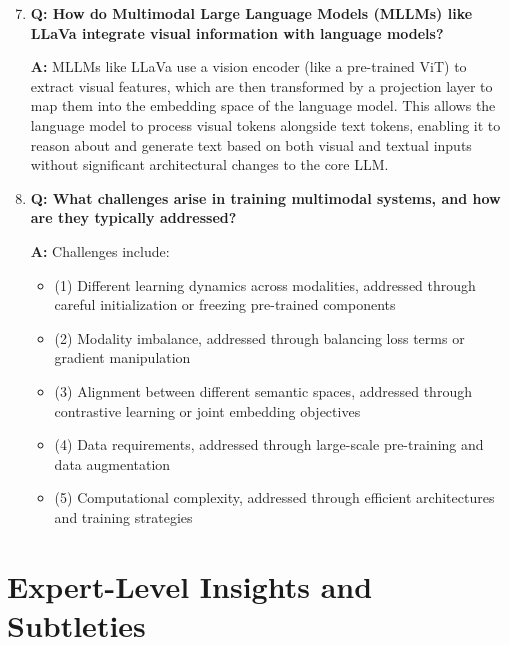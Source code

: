 \begin{enumerate}
    \setcounter{enumi}{6}
    \item \textbf{Q: How do Multimodal Large Language Models (MLLMs) like LLaVa integrate visual information with language models?}
    
    \textbf{A:} MLLMs like LLaVa use a vision encoder (like a pre-trained ViT) to extract visual features, which are then transformed by a projection layer to map them into the embedding space of the language model. This allows the language model to process visual tokens alongside text tokens, enabling it to reason about and generate text based on both visual and textual inputs without significant architectural changes to the core LLM.

    \item \textbf{Q: What challenges arise in training multimodal systems, and how are they typically addressed?}
    
    \textbf{A:} Challenges include:
    \begin{itemize}
        \item (1) Different learning dynamics across modalities, addressed through careful initialization or freezing pre-trained components
        \item (2) Modality imbalance, addressed through balancing loss terms or gradient manipulation
        \item (3) Alignment between different semantic spaces, addressed through contrastive learning or joint embedding objectives
        \item (4) Data requirements, addressed through large-scale pre-training and data augmentation
        \item (5) Computational complexity, addressed through efficient architectures and training strategies
    \end{itemize}
\end{enumerate}
\section*{Expert-Level Insights and Subtleties}


